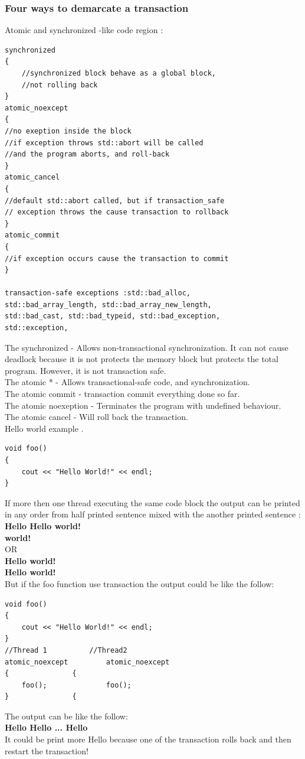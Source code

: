 \documentclass[12pt]{article}
\begin{document}
{\setlength{\parindent}{0cm}
\subsubsection{Four ways to demarcate a transaction}
Atomic and synchronized -like code region :\cite{Torvald}}
\hfill
\begin{lstlisting}
synchronized
{
	//synchronized block behave as a global block,
	//not rolling back
}
atomic_noexcept
{
//no exeption inside the block
//if exception throws std::abort will be called
//and the program aborts, and roll-back
}
atomic_cancel
{  
//default std::abort called, but if transaction_safe
// exception throws the cause transaction to rollback
}
atomic_commit
{
//if exception occurs cause the transaction to commit
}

transaction-safe exceptions :std::bad_alloc,
std::bad_array_length, std::bad_array_new_length,
std::bad_cast, std::bad_typeid, std::bad_exception,
std::exception,
\end{lstlisting}
{\setlength{\parindent}{0cm}
The synchronized - Allows non-transactional synchronization. It can not cause deadlock because it is not protects the memory block but protects the total program. However, it is not transaction safe.\\
The atomic * - Allows transactional-safe code, and synchronization.\\
The atomic commit - transaction commit everything done so far.\\
The atomic noexeption - Terminates the program with undefined behaviour.\\
The atomic cancel - Will roll back the transaction.
\cite{Torvald}\\

Hello world example .
}
\begin{lstlisting}
void foo()
{
	cout << "Hello World!" << endl;
}
\end{lstlisting}
{\setlength{\parindent}{0cm}
If more then one thread executing the same code block the output can be printed in any order from half printed sentence mixed with the another printed sentence :
\textbf{Hello Hello world!\\
world!}\\

OR\\

\textbf{Hello world!\\
Hello world!}\\

But if the foo function use transaction the output could be like the follow:
}
\begin{lstlisting}
void foo()
{
	cout << "Hello World!" << endl;
}
//Thread 1			//Thread2
atomic_noexcept			atomic_noexcept	
{				{
	foo();				foo();
}				{
\end{lstlisting}
{\setlength{\parindent}{0cm}
The output can be like the follow:\\
\textbf{Hello Hello ... Hello}\\
It could be print more Hello because one of the transaction rolls back and then restart the transaction!\\
}
\end{document}
